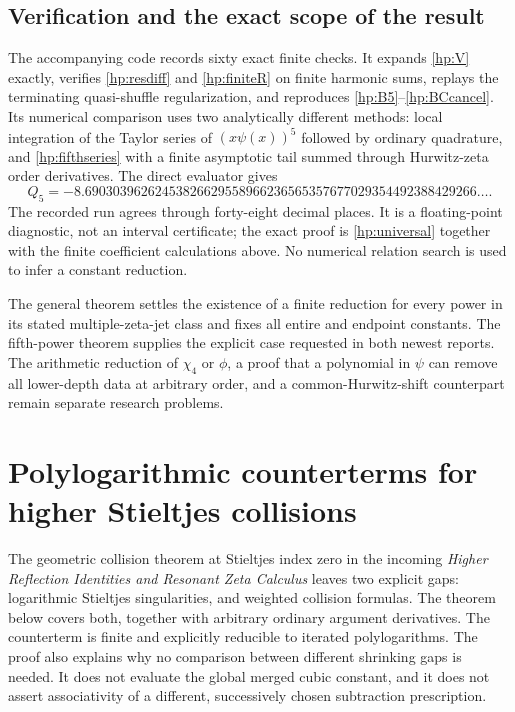 \documentclass[11pt]{article}
\numberwithin{equation}{section}
\theoremstyle{plain}
\theoremstyle{definition}
\theoremstyle{remark}
\begin{document}
\subsection{Verification and the exact scope of the result}

The accompanying code records sixty exact finite checks. It expands \eqref{hp:V} exactly, verifies
\eqref{hp:resdiff} and \eqref{hp:finiteR} on finite harmonic sums,
replays the terminating quasi-shuffle regularization, and reproduces
\eqref{hp:B5}--\eqref{hp:BCcancel}. Its numerical comparison uses
two analytically different methods: local integration of the Taylor
series of $(x\psi(x))^5$ followed by ordinary quadrature, and
\eqref{hp:fifthseries} with a finite asymptotic tail summed through
Hurwitz-zeta order derivatives. The direct evaluator gives
\[
 Q_5=-8.69030396262453826629558966236565357677029354492388429266\ldots.
\]
The recorded run agrees through forty-eight decimal places.
It is a floating-point diagnostic, not an interval certificate;
the exact proof is \eqref{hp:universal} together with the finite
coefficient calculations above. No numerical relation search is
used to infer a constant reduction.

The general theorem settles the existence of a finite reduction
for every power in its stated multiple-zeta-jet class and fixes
all entire and endpoint constants. The fifth-power theorem
supplies the explicit case requested in both newest reports.
The arithmetic reduction of $\chi_4$ or $\phi$, a proof that a
polynomial in $\psi$ can remove all lower-depth data at arbitrary
order, and a common-Hurwitz-shift counterpart remain separate
research problems.



\section{Polylogarithmic counterterms for higher Stieltjes collisions}
\label{gcx:section}

The geometric collision theorem at Stieltjes index zero in the incoming
\emph{Higher Reflection Identities and Resonant Zeta Calculus}\cite{repo:reflection} leaves two explicit gaps: logarithmic
Stieltjes singularities, and weighted collision formulas.  The theorem below
covers both, together with arbitrary ordinary argument derivatives.  The
counterterm is finite and explicitly reducible to iterated polylogarithms.
The proof also explains why no comparison between different shrinking gaps
is needed.  It does not evaluate the global merged cubic constant, and it
does not assert associativity of a different, successively chosen
subtraction prescription.
\end{document}
